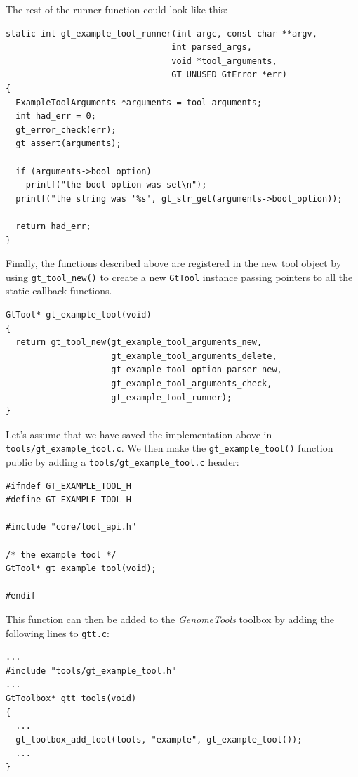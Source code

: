 \documentclass[11pt,final]{article}
\newcommand{\keyword}[1]{\lstinline{#1}}
\newcommand{\Gt}[0]{\emph{GenomeTools}\xspace}
\begin{document}
The rest of the runner function could look like this:

\begin{lstlisting}
static int gt_example_tool_runner(int argc, const char **argv,
                                 int parsed_args,
                                 void *tool_arguments,
                                 GT_UNUSED GtError *err)
{
  ExampleToolArguments *arguments = tool_arguments;
  int had_err = 0;
  gt_error_check(err);
  gt_assert(arguments);

  if (arguments->bool_option)
    printf("the bool option was set\n");
  printf("the string was '%s', gt_str_get(arguments->bool_option));

  return had_err;
}
\end{lstlisting}

Finally, the functions described above are registered in the new tool object
by using \keyword{gt_tool_new()} to create a new \keyword{GtTool} instance
passing pointers to all the static callback functions.

\begin{lstlisting}
GtTool* gt_example_tool(void)
{
  return gt_tool_new(gt_example_tool_arguments_new,
                     gt_example_tool_arguments_delete,
                     gt_example_tool_option_parser_new,
                     gt_example_tool_arguments_check,
                     gt_example_tool_runner);
}
\end{lstlisting}

Let's assume that we have saved the implementation above in
\keyword{tools/gt_example_tool.c}. We then make the \keyword{gt_example_tool()}
function public by adding a \keyword{tools/gt_example_tool.c} header:

\begin{lstlisting}
#ifndef GT_EXAMPLE_TOOL_H
#define GT_EXAMPLE_TOOL_H

#include "core/tool_api.h"

/* the example tool */
GtTool* gt_example_tool(void);

#endif
\end{lstlisting}

This function can then be added to the \Gt toolbox by adding the following lines
to \keyword{gtt.c}:

\begin{lstlisting}
...
#include "tools/gt_example_tool.h"
...
GtToolbox* gtt_tools(void)
{
  ...
  gt_toolbox_add_tool(tools, "example", gt_example_tool());
  ...
}
\end{lstlisting}
\end{document}
